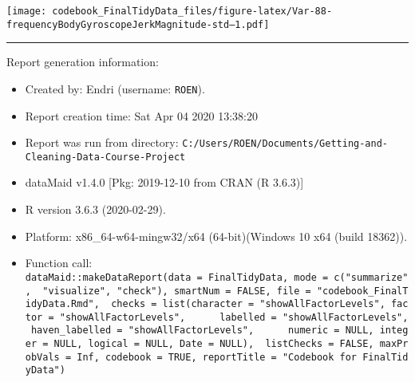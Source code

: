 \documentclass[
]{article}
\begin{document}
\texttt{[image: codebook\_FinalTidyData\_files/figure-latex/Var-88-frequencyBodyGyroscopeJerkMagnitude-std---1.pdf]}

\begin{center}\rule{0.5\linewidth}{0.5pt}\end{center}

Report generation information:

\begin{itemize}
\item
  Created by: Endri (username: \texttt{ROEN}).
\item
  Report creation time: Sat Apr 04 2020 13:38:20
\item
  Report was run from directory:
  \texttt{C:/Users/ROEN/Documents/Getting-and-Cleaning-Data-Course-Project}
\item
  dataMaid v1.4.0 {[}Pkg: 2019-12-10 from CRAN (R 3.6.3){]}
\item
  R version 3.6.3 (2020-02-29).
\item
  Platform: x86\_64-w64-mingw32/x64 (64-bit)(Windows 10 x64 (build
  18362)).
\item
  Function call:
  \texttt{dataMaid::makeDataReport(data\ =\ FinalTidyData,\ mode\ =\ c("summarize",\ \ "visualize",\ "check"),\ smartNum\ =\ FALSE,\ file\ =\ "codebook\_FinalTidyData.Rmd",\ \ checks\ =\ list(character\ =\ "showAllFactorLevels",\ factor\ =\ "showAllFactorLevels",\ \ \ \ \ \ labelled\ =\ "showAllFactorLevels",\ haven\_labelled\ =\ "showAllFactorLevels",\ \ \ \ \ \ numeric\ =\ NULL,\ integer\ =\ NULL,\ logical\ =\ NULL,\ Date\ =\ NULL),\ \ listChecks\ =\ FALSE,\ maxProbVals\ =\ Inf,\ codebook\ =\ TRUE,\ reportTitle\ =\ "Codebook\ for\ FinalTidyData")}
\end{itemize}
\end{document}
